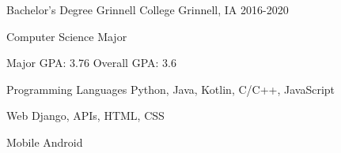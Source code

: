 \documentclass[12pt, a4paper]{awesome-cv}
\begin{document}
\begin{cventries}


\end{cventries}


\begin{cventries}
  \cventry
    {Bachelor's Degree}
    {Grinnell College}
    {Grinnell, IA}
    {2016-2020}
    {
      \begin{cvitems}
        \item {Computer Science Major}
        \item {Major GPA: 3.76 \quad Overall GPA: 3.6}
      \end{cvitems}
    }
\end{cventries}


\begin{cvskills}
  \cvskill
    {Programming Languages} 
    {Python, Java, Kotlin, C/C++, JavaScript} 

  \cvskill
    {Web}
    {Django, APIs, HTML, CSS}

  \cvskill
    {Mobile}
    {Android}

\end{cvskills}


%
%
\end{document}
